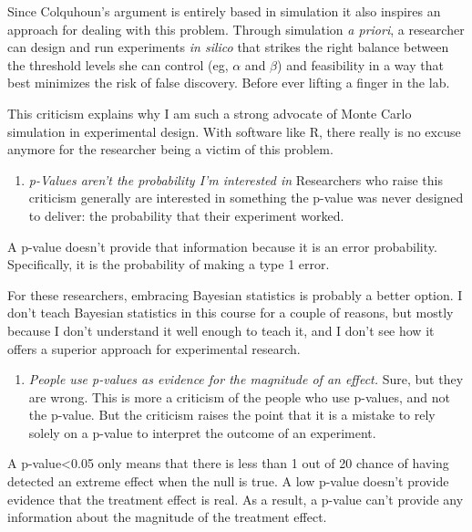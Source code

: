 \documentclass[]{book}
\providecommand{\tightlist}{%
  \setlength{\itemsep}{0pt}\setlength{\parskip}{0pt}}
\begin{document}
Since Colquhoun's argument is entirely based in simulation it also inspires an approach for dealing with this problem. Through simulation \emph{a priori}, a researcher can design and run experiments \emph{in silico} that strikes the right balance between the threshold levels she can control (eg, \(\alpha\) and \(\beta\)) and feasibility in a way that best minimizes the risk of false discovery. Before ever lifting a finger in the lab.

This criticism explains why I am such a strong advocate of Monte Carlo simulation in experimental design. With software like R, there really is no excuse anymore for the researcher being a victim of this problem.

\begin{enumerate}
\def\labelenumi{\arabic{enumi}.}
\setcounter{enumi}{2}
\tightlist
\item
  \emph{p-Values aren't the probability I'm interested in}
  Researchers who raise this criticism generally are interested in something the p-value was never designed to deliver: the probability that their experiment worked.
\end{enumerate}

A p-value doesn't provide that information because it is an error probability. Specifically, it is the probability of making a type 1 error.

For these researchers, embracing Bayesian statistics is probably a better option. I don't teach Bayesian statistics in this course for a couple of reasons, but mostly because I don't understand it well enough to teach it, and I don't see how it offers a superior approach for experimental research.

\begin{enumerate}
\def\labelenumi{\arabic{enumi}.}
\setcounter{enumi}{3}
\tightlist
\item
  \emph{People use p-values as evidence for the magnitude of an effect.}
  Sure, but they are wrong. This is more a criticism of the people who use p-values, and not the p-value. But the criticism raises the point that it is a mistake to rely solely on a p-value to interpret the outcome of an experiment.
\end{enumerate}

A p-value\textless{}0.05 only means that there is less than 1 out of 20 chance of having detected an extreme effect when the null is true. A low p-value doesn't provide evidence that the treatment effect is real. As a result, a p-value can't provide any information about the magnitude of the treatment effect.
\end{document}
